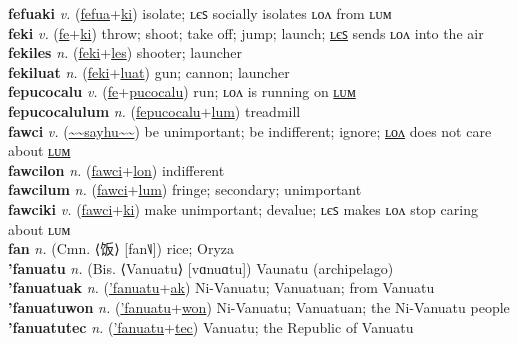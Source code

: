 \textbf{fefuaki} \textit{v.} (\hyperref[fefua]{fefua}+\hyperref[ki]{ki})
isolate; ʟєꜱ socially isolates ʟᴏᴧ from ʟᴜᴍ \label{fefuaki} \\
\textbf{feki} \textit{v.} (\hyperref[fe]{fe}+\hyperref[ki]{ki})
throw; shoot; take off; jump; launch; \hyperref[fekiles]{ʟєꜱ} sends ʟᴏᴧ into the air \label{feki} \\
\textbf{fekiles} \textit{n.} (\hyperref[feki]{feki}+\hyperref[les]{les})
shooter; launcher \label{fekiles} \\
\textbf{fekiluat} \textit{n.} (\hyperref[feki]{feki}+\hyperref[luat]{luat})
gun; cannon; launcher \label{fekiluat} \\
\textbf{fepucocalu} \textit{v.} (\hyperref[fe]{fe}+\hyperref[pucocalu]{pucocalu})
run; ʟᴏᴧ is running on \hyperref[fepucocalulum]{ʟᴜᴍ} \label{fepucocalu} \\
\textbf{fepucocalulum} \textit{n.} (\hyperref[fepucocalu]{fepucocalu}+\hyperref[lum]{lum})
treadmill \label{fepucocalulum} \\
\textbf{fawci} \textit{v.} (\hyperref[sayhu]{\~{}\~{}sayhu\~{}\~{}})
be unimportant; be indifferent; ignore; \hyperref[fawcilon]{ʟᴏᴧ} does not care about \hyperref[fawcilum]{ʟᴜᴍ} \label{fawci} \\
\textbf{fawcilon} \textit{n.} (\hyperref[fawci]{fawci}+\hyperref[lon]{lon})
indifferent \label{fawcilon} \\
\textbf{fawcilum} \textit{n.} (\hyperref[fawci]{fawci}+\hyperref[lum]{lum})
fringe; secondary; unimportant \label{fawcilum} \\
\textbf{fawciki} \textit{v.} (\hyperref[fawci]{fawci}+\hyperref[ki]{ki})
make unimportant; devalue; ʟєꜱ makes ʟᴏᴧ stop caring about ʟᴜᴍ \label{fawciki} \\
\textbf{fan} \textit{n.} (Cmn. ⟨饭⟩ [fan˥˩])
rice; Oryza \label{fan} \\
\textbf{'fanuatu} \textit{n.} (Bis. ⟨Vanuatu⟩ [vɑnuɑtu])
Vaunatu (archipelago) \label{'fanuatu} \\
\textbf{'fanuatuak} \textit{n.} (\hyperref['fanuatu]{'fanuatu}+\hyperref[ak]{ak})
Ni-Vanuatu; Vanuatuan; from Vanuatu \label{'fanuatuak} \\
\textbf{'fanuatuwon} \textit{n.} (\hyperref['fanuatu]{'fanuatu}+\hyperref[won]{won})
Ni-Vanuatu; Vanuatuan; the Ni-Vanuatu people \label{'fanuatuwon} \\
\textbf{'fanuatutec} \textit{n.} (\hyperref['fanuatu]{'fanuatu}+\hyperref[tec]{tec})
Vanuatu; the Republic of Vanuatu \label{'fanuatutec} \\
